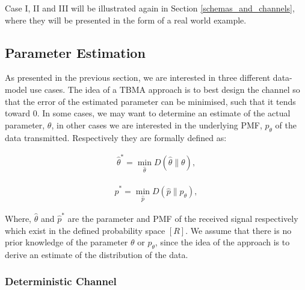\documentclass{article}
\begin{document}
Case I, II and III will be illustrated again in Section \ref{schemas_and_channels}, where they will be presented in the form of a real world example. 

\subsection{Parameter Estimation}\label{param_estimation}

As presented in the previous section, we are interested in three different data-model use cases. The idea of a TBMA  approach is to best design the channel so that the error of the estimated parameter can be minimised, such that it tends toward 0.  In some cases, we may want to determine an estimate of the actual parameter, $\theta$, in other cases we are interested in the underlying PMF, $p_{\theta}$ of the data transmitted. Respectively they are formally defined as:

\begin{align}
\hat{\theta}^* = \min_{\hat{\theta}} D(\hat{\theta}\|{\theta}),      
\end{align}

\begin{align}
\hat{p}^* = \min_{\hat{p}} D(\hat{p}\|p_{\theta}),  
\end{align}

Where, $\hat{\theta}$ and $\hat{p}^*$ are the parameter and PMF of the received signal respectively which exist in the defined probability space $[R]$.  We assume that there is no prior knowledge of the parameter $\theta$ or $p_{\theta}$, since the idea of the approach is to derive an estimate of the distribution of the data.


\subsubsection{Deterministic Channel}\label{det_chan}
\end{document}
